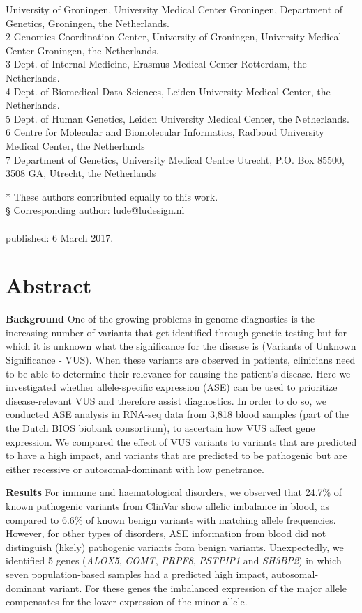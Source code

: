 University of Groningen, University Medical Center Groningen, Department of Genetics, Groningen, the Netherlands.\\
2 Genomics Coordination Center, University of Groningen, University Medical Center Groningen, the Netherlands.\\
3 Dept. of Internal Medicine, Erasmus Medical Center Rotterdam, the Netherlands.\\
4 Dept. of Biomedical Data Sciences, Leiden University Medical Center, the Netherlands.\\
5 Dept. of Human Genetics, Leiden University Medical Center, the Netherlands.\\
6 Centre for Molecular and Biomolecular Informatics, Radboud University Medical Center, the Netherlands\\
7 Department of Genetics, University Medical Centre Utrecht, P.O. Box 85500, 3508 GA, Utrecht, the Netherlands

* These authors contributed equally to this work.\\
§ Corresponding author: lude@ludesign.nl
\\
\\
\noindent
published: 6 March 2017.

\newpage

\section*{Abstract}
\textbf{Background} One of the growing problems in genome diagnostics is the increasing number of variants that get identified through genetic testing but for which it is unknown what the significance for the disease is (Variants of Unknown Significance - VUS)\cite{hoffman-andrewsKnownUnknownChallenges2018,direstaNextgenerationSequencingApproach2018}. When these variants are observed in patients, clinicians need to be able to determine their relevance for causing the patient’s disease. Here we investigated whether allele-specific expression (ASE) can be used to prioritize disease-relevant VUS and therefore assist diagnostics. In order  to do so, we conducted ASE analysis in RNA-seq data from 3,818 blood samples (part of the the Dutch BIOS biobank consortium), to ascertain how VUS affect gene expression. We compared the effect of VUS variants to variants that are predicted to have a high impact, and variants that are predicted to be pathogenic but are either recessive or autosomal-dominant with low penetrance.


\textbf{Results} For immune and haematological disorders, we observed that 24.7\% of known pathogenic variants from ClinVar show allelic imbalance in blood, as compared to 6.6\% of known benign variants with matching allele frequencies. However, for other types of disorders, ASE information from blood did not distinguish (likely) pathogenic variants from benign variants. Unexpectedly, we identified 5 genes (\emph{ALOX5}, \emph{COMT}, \emph{PRPF8}, \emph{PSTPIP1} and \emph{SH3BP2}) in which seven population-based samples had a predicted high impact, autosomal-dominant variant. For these genes the imbalanced expression of the major allele compensates for the lower expression of the minor allele.


